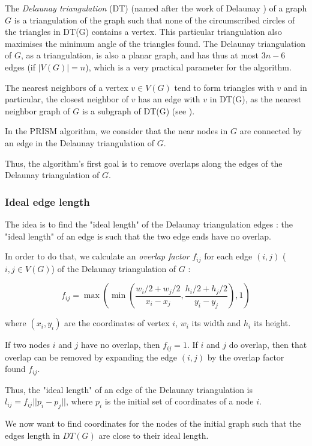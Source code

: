 \documentclass[12pt]{report}
\begin{document}
The \emph{Delaunay triangulation} (DT) (named after the work of Delaunay \cite{De34}) of a graph $G$ is a triangulation of the graph such that none of the circumscribed circles of the triangles in DT(G) contains a vertex. This particular triangulation also maximises the minimum angle of the triangles found.
The Delaunay triangulation of $G$, as a triangulation, is also a planar graph, and has thus at most $3n -6$ edges (if $|V(G)| = n$), which is a very practical parameter for the algorithm.

\bigskip

The nearest neighbors of a vertex $v \in V(G)$ tend to form triangles with $v$ and in particular, the closest neighbor of $v$ has an edge with $v$ in DT(G), as the nearest neighbor graph of $G$ is a subgraph of DT(G) (see \cite{JT92}).

In the PRISM algorithm, we consider that the near nodes in $G$ are connected by an edge in the Delaunay triangulation of $G$.

Thus, the algorithm's first goal is to remove overlaps along the edges of the Delaunay triangulation of $G$.

\subsubsection{Ideal edge length}
The idea is to find the "ideal length" of the Delaunay triangulation edges : the "ideal length" of an edge is such that the two edge ends have no overlap.

\bigskip
In order to do that, we calculate an \emph{overlap factor} $f_{ij}$ for each edge $(i,j)$ ($i,j \in V(G)$) of the Delaunay triangulation of $G$ :

\[ f_{ij} = \max ( \min (\frac{w_i/2 + w_j/2}{x_i - x_j}, 
\frac{h_i/2 + h_j/2}{y_i - y_j}), 1)\]

where $(x_i,y_i)$ are the coordinates of vertex $i$, $w_i$ its width and $h_i$ its height.

If two nodes $i$ and $j$ have no overlap, then $f_{ij} = 1$. 
If $i$ and $j$ do overlap, then that overlap can be removed by expanding the edge $(i,j)$ by the overlap factor found $f_{ij}$. %

\bigskip
Thus, the "ideal length" of an edge of the Delaunay triangulation is $l_{ij} = f_{ij}||p_i - p_j||$, where $p_i$ is the initial set of coordinates of a node $i$.

We now want to find coordinates for the nodes of the initial graph such that the edges length in $DT(G)$ are close to their ideal length.
\end{document}
